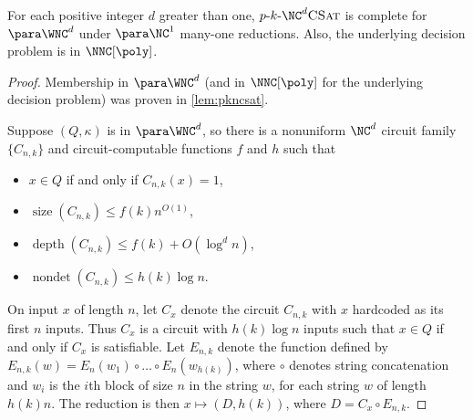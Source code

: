 \documentclass{article}
\newcommand{\dash}{\textnormal{-}}
\newcommand{\pNCSAT}{p \dash k \dash \NC^d \textsc{CSat}}
\DeclareMathOperator{\depth}{depth}
\DeclareMathOperator{\nondet}{nondet}
\DeclareMathOperator{\size}{size}
\begin{document}
\begin{theorem}\label{thm:parawncdcomplete}
  For each positive integer $d$ greater than one, $\pNCSAT$ is complete for $\para \WNC^d$ under $\para \NC^1$ many-one reductions.
  Also, the underlying decision problem is in $\NNC[\poly]$.
\end{theorem}
\begin{proof}
  Membership in $\para \WNC^d$ (and in $\NNC[\poly]$ for the underlying decision problem) was proven in \autoref{lem:pkncsat}.

  Suppose $(Q, \kappa)$ is in $\para \WNC^d$, so there is a nonuniform $\NC^d$ circuit family $\{C_{n, k}\}$ and circuit-computable functions $f$ and $h$ such that
  \begin{itemize}
  \item $x \in Q$ if and only if $C_{n, k}(x) = 1$,
  \item $\size(C_{n, k}) \leq f(k) n^{O(1)}$,
  \item $\depth(C_{n, k}) \leq f(k) + O(\log^d n)$,
  \item $\nondet(C_{n, k}) \leq h(k) \log n$.
  \end{itemize}
  On input $x$ of length $n$, let $C_x$ denote the circuit $C_{n, k}$ with $x$ hardcoded as its first $n$ inputs.
  Thus $C_x$ is a circuit with $h(k) \log n$ inputs such that $x \in Q$ if and only if $C_x$ is satisfiable.
  Let $E_{n, k}$ denote the function defined by $E_{n, k}(w) = E_n(w_1) \circ \dotsc \circ E_n(w_{h(k)})$, where $\circ$ denotes string concatenation and $w_i$ is the $i$th block of size $n$ in the string $w$, for each string $w$ of length $h(k) n$.
  The reduction is then $x \mapsto (D, h(k))$, where $D = C_x \circ E_{n, k}$.


\end{proof}
\end{document}
